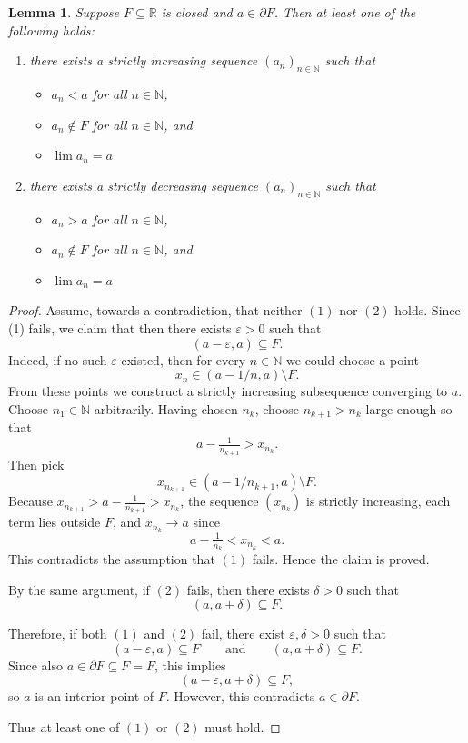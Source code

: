 \documentclass[10pt,a4paper]{amsart}
\newtheorem{lem}{Lemma}
\def\bb{\mathbb}
\begin{document}
\begin{lem}\label{lem boundary seq}
Suppose \(F\subseteq \mathbb R\) is closed and \(a\in \partial F\). Then at least one of the following holds:
\begin{enumerate}
\item[{\rm (1)}] there exists a strictly increasing sequence \((a_n)_{n\in \bb N}\) such that
\begin{itemize}
    \item $a_n<a$ for all $n\in \bb N$,
    \item $a_n\notin F$ for all $n\in \bb N$, and 
    \item $\lim a_n=a$
\end{itemize}
\item[{\rm (2)}] there exists a strictly decreasing sequence \((a_n)_{n\in \bb N}\) such that
\begin{itemize}
    \item $a_n>a$ for all $n\in \bb N$,
    \item $a_n\notin F$ for all $n\in \bb N$, and 
    \item $\lim a_n=a$
\end{itemize}
\end{enumerate}
\end{lem}

\begin{proof}
Assume, towards a contradiction, that neither \((1)\) nor \((2)\) holds.  Since (1) fails, we claim that then there exists \(\varepsilon>0\) such that
\[
(a-\varepsilon,a)\subseteq F.
\]
Indeed, if no such \(\varepsilon\) existed, then for every \(n\in \mathbb N\) we could choose a point
\[
x_n\in (a-1/n,a)\setminus F.
\]
From these points we construct a strictly increasing subsequence converging to \(a\). Choose \(n_1\in \mathbb N\) arbitrarily. Having chosen \(n_k\), choose \(n_{k+1}>n_k\) large enough so that
\[
a-\tfrac1{n_{k+1}} > x_{n_k}.
\]
Then pick
\[
x_{n_{k+1}}\in (a-1/n_{k+1},a)\setminus F.
\]
Because \(x_{n_{k+1}}>a-\tfrac1{n_{k+1}}>x_{n_k}\), the sequence \((x_{n_k})\) is strictly increasing, each term lies outside \(F\), and \(x_{n_k}\to a\) since
\[
a-\tfrac1{n_k}<x_{n_k}<a.
\]
This contradicts the assumption that \((1)\) fails. Hence the claim is proved.

By the same argument, if \((2)\) fails, then there exists \(\delta>0\) such that
\[
(a,a+\delta)\subseteq F.
\]

Therefore, if both \((1)\) and \((2)\) fail, there exist \(\varepsilon,\delta>0\) such that
\[
(a-\varepsilon,a)\subseteq F
\qquad\text{and}\qquad
(a,a+\delta)\subseteq F.
\]
Since also \(a\in \partial F\subseteq \overline F=F\), this implies
\[
(a-\varepsilon,a+\delta)\subseteq F,
\]
so \(a\) is an interior point of \(F\). However, this contradicts \(a\in \partial F\).

Thus at least one of \((1)\) or \((2)\) must hold.
\end{proof}
\end{document}
